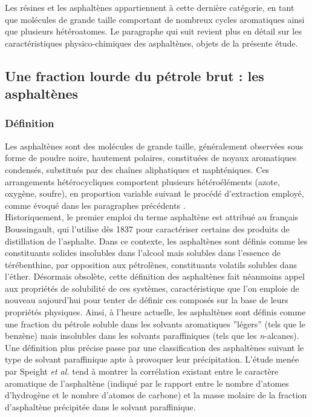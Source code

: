 Les résines et les asphaltènes appartiennent à cette dernière catégorie, en tant que molécules de grande taille comportant de nombreux cycles aromatiques ainsi que plusieurs hétéroatomes. Le paragraphe qui suit revient plus en détail sur les caractéristiques physico-chimiques des asphaltènes, objets de la présente étude. 

\subsection{Une fraction lourde du pétrole brut : les asphaltènes}


\subsubsection{Définition}

Les asphaltènes sont des molécules de grande taille, généralement observées sous forme de poudre noire, hautement polaires, constituées de noyaux aromatiques condensés, substitués par des chaînes aliphatiques et naphténiques. Ces arrangements hétérocycliques comportent plusieurs hétéroéléments (azote, oxygène, soufre), en proportion variable suivant le procédé d'extraction employé, comme évoqué dans les paragraphes précédents \cite{calles2007properties}.\\

Historiquement, le premier emploi du terme \og asphaltène \fg{} est attribué au français Boussingault, qui l'utilise dès 1837 pour caractériser certains des produits de distillation de l'asphalte\cite{goual2012petroleum}. Dans ce contexte, les \og asphaltènes \fg{} sont définis comme les constituants solides insolubles dans l'alcool mais solubles dans l'essence de térébenthine, par opposition aux \og pétrolènes\fg, constituants volatils solubles dans l'éther.
Désormais obsolète, cette définition des asphaltènes fait néanmoins appel aux propriétés de solubilité de ces systèmes, caractéristique que l'on emploie de nouveau aujourd'hui pour tenter de définir ces composés sur la base de leurs propriétés physiques. Ainsi, à l'heure actuelle, les asphaltènes sont définis comme une fraction du pétrole soluble dans les solvants aromatiques ''légers'' (tels que le benzène) mais insolubles dans les solvants paraffiniques (tels que les \textit{n}-alcanes). Une définition plus précise passe par une classification des asphaltènes suivant le type de solvant paraffinique apte à provoquer leur précipitation. L'étude menée par Speight \textit{et al.} \cite{speight2004petroleum} tend à montrer la corrélation existant entre le caractère aromatique de l'asphaltène (indiqué par le rapport entre le nombre d'atomes d'hydrogène et le nombre d'atomes de carbone) et la masse molaire de la fraction d'asphaltène précipitée dans le solvant paraffinique.\\  

